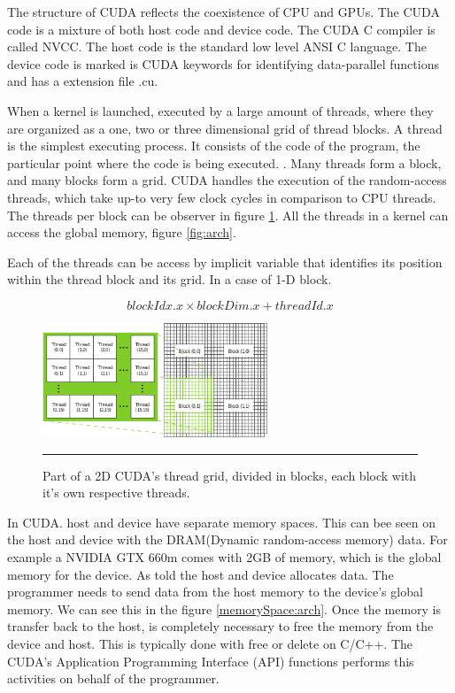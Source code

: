 The structure of CUDA reflects the coexistence of CPU and GPUs. The CUDA code is a mixture of both host code and device code. The CUDA C compiler is called NVCC. The host code is the standard low level ANSI C language. The device code is marked is CUDA keywords for identifying data-parallel functions and has a extension file .cu.

When a kernel is launched, executed by a large amount of threads, where they are organized as a one, two or three dimensional grid of thread blocks. A thread is the simplest executing process. It consists of the code of the program, the particular point where the code is being executed. \cite{hwu}. Many threads form a block, and many blocks form a grid. CUDA handles the execution of the random-access threads, which take up-to very few clock cycles in comparison to CPU threads. The threads per block can be observer in figure \ref{fig:grid}. All the threads in a kernel can access the global memory, figure \ref{fig:arch}.

Each of the threads can be access by implicit variable that identifies its position within the thread block and its grid. In a case of 1-D block. \cite{example}

$$blockIdx.x \times blockDim.x + threadId.x$$

\begin{figure}[htbp]
	\centering
		\includegraphics[width=0.6\textwidth]{Figures/grid.png}
		\rule{35em}{0.5pt}
	\caption[Part of the CUDA's 2D grid]{Part of a 2D CUDA's thread grid, divided in blocks, each block with it’s own respective threads.}
	\label{fig:grid}
\end{figure}

In CUDA. host and device have separate memory spaces. This can bee seen on the host and device with the DRAM(Dynamic random-access memory) data. For example a NVIDIA GTX 660m comes with 2GB of memory, which is the global memory for the device. As told the host and device allocates data. The programmer needs to send data from the host memory to the device's global memory. We can see this in the figure  \ref{memorySpace:arch}.  Once the memory is transfer back to the host, is completely necessary to free the memory from the device and host. This is typically done with free or delete on C/C++. The CUDA's Application Programming Interface (API) functions performs this activities on behalf of the programmer.   \cite{hwu}

